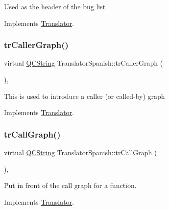Used as the header of the bug list 

Implements \mbox{\hyperlink{class_translator}{Translator}}.

\mbox{\label{class_translator_spanish_a63ae21f1b74773f68b479cc7edb84445}} 
\subsubsection{\texorpdfstring{trCallerGraph()}{trCallerGraph()}}
{\footnotesize\ttfamily virtual \mbox{\hyperlink{class_q_c_string}{Q\+C\+String}} Translator\+Spanish\+::tr\+Caller\+Graph (\begin{DoxyParamCaption}{ }\end{DoxyParamCaption})\hspace{0.3cm}{\ttfamily [inline]}, {\ttfamily [virtual]}}

This is used to introduce a caller (or called-\/by) graph 

Implements \mbox{\hyperlink{class_translator}{Translator}}.

\mbox{\label{class_translator_spanish_ac0d0fc237cca71f4d8647d9c65174575}} 
\subsubsection{\texorpdfstring{trCallGraph()}{trCallGraph()}}
{\footnotesize\ttfamily virtual \mbox{\hyperlink{class_q_c_string}{Q\+C\+String}} Translator\+Spanish\+::tr\+Call\+Graph (\begin{DoxyParamCaption}{ }\end{DoxyParamCaption})\hspace{0.3cm}{\ttfamily [inline]}, {\ttfamily [virtual]}}

Put in front of the call graph for a function. 

Implements \mbox{\hyperlink{class_translator}{Translator}}.

\mbox{\label{class_translator_spanish_af636d48e7e01ef57c053db6eec55fc55}} 
